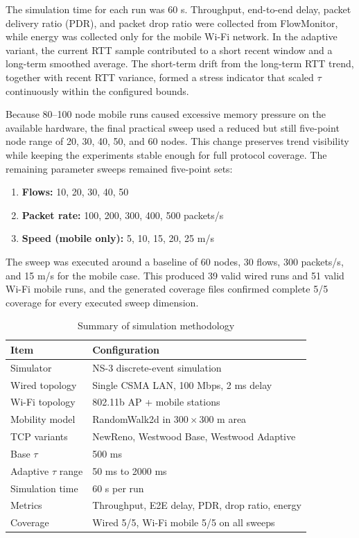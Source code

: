 \documentclass[conference,10pt,a4paper]{IEEEtran}
\begin{document}
The simulation time for each run was 60 s. Throughput, end-to-end delay, packet delivery ratio (PDR), and packet drop ratio were collected from FlowMonitor, while energy was collected only for the mobile Wi-Fi network. In the adaptive variant, the current RTT sample contributed to a short recent window and a long-term smoothed average. The short-term drift from the long-term RTT trend, together with recent RTT variance, formed a stress indicator that scaled $\tau$ continuously within the configured bounds.

Because 80--100 node mobile runs caused excessive memory pressure on the available hardware, the final practical sweep used a reduced but still five-point node range of 20, 30, 40, 50, and 60 nodes. This change preserves trend visibility while keeping the experiments stable enough for full protocol coverage. The remaining parameter sweeps remained five-point sets:
\begin{enumerate}
    \item \textbf{Flows:} 10, 20, 30, 40, 50
    \item \textbf{Packet rate:} 100, 200, 300, 400, 500 packets/s
    \item \textbf{Speed (mobile only):} 5, 10, 15, 20, 25 m/s
\end{enumerate}

The sweep was executed around a baseline of 60 nodes, 30 flows, 300 packets/s, and 15 m/s for the mobile case. This produced 39 valid wired runs and 51 valid Wi-Fi mobile runs, and the generated coverage files confirmed complete 5/5 coverage for every executed sweep dimension.

\begin{table}[htbp]
    \centering
    \caption{Summary of simulation methodology}
    \label{tab:methodology}
    \begin{tabular}{@{}ll@{}}
        \toprule
        \textbf{Item} & \textbf{Configuration} \\
        \midrule
        Simulator & NS-3 discrete-event simulation \\
        Wired topology & Single CSMA LAN, 100 Mbps, 2 ms delay \\
        Wi-Fi topology & 802.11b AP + mobile stations \\
        Mobility model & RandomWalk2d in $300 \times 300$ m area \\
        TCP variants & NewReno, Westwood Base, Westwood Adaptive \\
        Base $\tau$ & 500 ms \\
        Adaptive $\tau$ range & 50 ms to 2000 ms \\
        Simulation time & 60 s per run \\
        Metrics & Throughput, E2E delay, PDR, drop ratio, energy \\
        Coverage & Wired 5/5, Wi-Fi mobile 5/5 on all sweeps \\
        \bottomrule
    \end{tabular}
\end{table}
\end{document}
